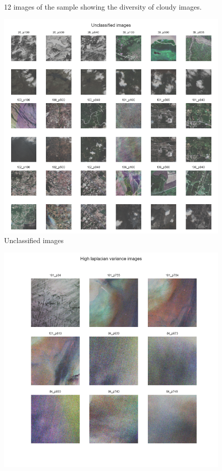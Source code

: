 \documentclass[../main.tex]{subfiles}
\begin{document}
\begin{appendices}
\begin{figure}[H]
	\caption{12 images of the sample showing the diversity of cloudy images.}
	\label{fig:eda-first-exploration}
\end{figure}
\begin{figure}[H]
	\centering
	\includegraphics[width=16cm]{imgs/eda/unclassified}
	\caption{Unclassified images}
	\label{fig:eda-unclassified}
\end{figure}
\begin{figure}[H]
	\centering
	\includegraphics[width=16cm]{imgs/eda/high-blur}

\end{figure}
\end{appendices}
\end{document}
